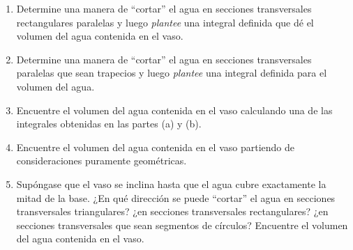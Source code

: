     \begin{enumerate}
        \item[(a)] Determine una manera de ``cortar'' el agua en secciones transversales rectangulares paralelas y luego \textit{plantee} una integral definida que dé el volumen del agua contenida en el vaso.
        \item[(b)] Determine una manera de ``cortar'' el agua en secciones transversales paralelas que sean trapecios y luego \textit{plantee} una integral definida para el volumen del agua.
        \item[(c)] Encuentre el volumen del agua contenida en el vaso calculando una de las integrales obtenidas en las partes (a) y (b).
        \item[(d)] Encuentre el volumen del agua contenida en el vaso partiendo de consideraciones puramente geométricas.
        \item[(e)] Supóngase que el vaso se inclina hasta que el agua cubre exactamente la mitad de la base. ¿En qué dirección se puede ``cortar'' el agua en secciones transversales triangulares? ¿en secciones transversales rectangulares? ¿en secciones transversales que sean segmentos de círculos? Encuentre el volumen del agua contenida en el vaso.
    \end{enumerate}
